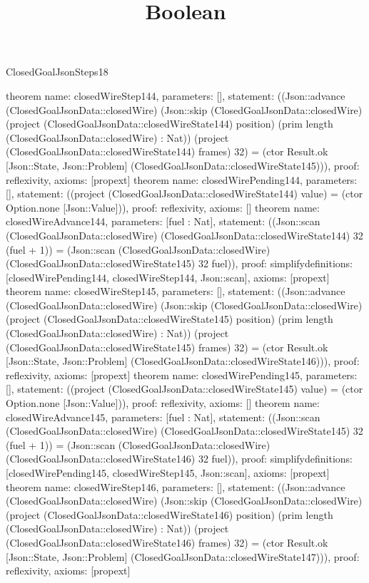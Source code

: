 \begin{lexlean}{ClosedGoalJsonSteps18}
\title{Boolean}
\begin{semanticmodule}
theorem{
 name: closedWireStep144, parameters: [],
 statement: ((Json::advance (ClosedGoalJsonData::closedWire) (Json::skip (ClosedGoalJsonData::closedWire) (project (ClosedGoalJsonData::closedWireState144) position) (prim length (ClosedGoalJsonData::closedWire) : Nat)) (project (ClosedGoalJsonData::closedWireState144) frames) 32) = (ctor Result.ok [Json::State, Json::Problem] (ClosedGoalJsonData::closedWireState145))), proof: reflexivity{}, axioms: [propext]
}
theorem{
 name: closedWirePending144, parameters: [],
 statement: ((project (ClosedGoalJsonData::closedWireState144) value) = (ctor Option.none [Json::Value])), proof: reflexivity{}, axioms: []
}
theorem{
 name: closedWireAdvance144, parameters: [fuel : Nat],
 statement: ((Json::scan (ClosedGoalJsonData::closedWire) (ClosedGoalJsonData::closedWireState144) 32 (fuel + 1)) = (Json::scan (ClosedGoalJsonData::closedWire) (ClosedGoalJsonData::closedWireState145) 32 fuel)), proof: simplify{definitions: [closedWirePending144, closedWireStep144, Json::scan]}, axioms: [propext]
}
theorem{
 name: closedWireStep145, parameters: [],
 statement: ((Json::advance (ClosedGoalJsonData::closedWire) (Json::skip (ClosedGoalJsonData::closedWire) (project (ClosedGoalJsonData::closedWireState145) position) (prim length (ClosedGoalJsonData::closedWire) : Nat)) (project (ClosedGoalJsonData::closedWireState145) frames) 32) = (ctor Result.ok [Json::State, Json::Problem] (ClosedGoalJsonData::closedWireState146))), proof: reflexivity{}, axioms: [propext]
}
theorem{
 name: closedWirePending145, parameters: [],
 statement: ((project (ClosedGoalJsonData::closedWireState145) value) = (ctor Option.none [Json::Value])), proof: reflexivity{}, axioms: []
}
theorem{
 name: closedWireAdvance145, parameters: [fuel : Nat],
 statement: ((Json::scan (ClosedGoalJsonData::closedWire) (ClosedGoalJsonData::closedWireState145) 32 (fuel + 1)) = (Json::scan (ClosedGoalJsonData::closedWire) (ClosedGoalJsonData::closedWireState146) 32 fuel)), proof: simplify{definitions: [closedWirePending145, closedWireStep145, Json::scan]}, axioms: [propext]
}
theorem{
 name: closedWireStep146, parameters: [],
 statement: ((Json::advance (ClosedGoalJsonData::closedWire) (Json::skip (ClosedGoalJsonData::closedWire) (project (ClosedGoalJsonData::closedWireState146) position) (prim length (ClosedGoalJsonData::closedWire) : Nat)) (project (ClosedGoalJsonData::closedWireState146) frames) 32) = (ctor Result.ok [Json::State, Json::Problem] (ClosedGoalJsonData::closedWireState147))), proof: reflexivity{}, axioms: [propext]
}
\end{semanticmodule}
\end{lexlean}
